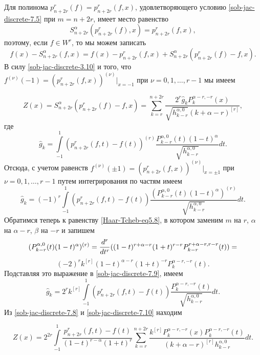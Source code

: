 Для полинома $p_{n+2r}^r(f)=p_{n+2r}^r(f,x)$, удовлетворяющего условию \eqref{sob-jac-discrete-7.5} при $m=n+2r$,  имеет место равенство
\begin{equation}\label{sob-jac-discrete-7.6}
 S_{n+2r}^\alpha(p_{n+2r}^r(f), x)=p_{n+2r}^r(f,x),
\end{equation}
поэтому, если $f\in W^r$, то мы можем записать
\begin{equation}\label{sob-jac-discrete-7.7}
 f(x)-S_{n+2r}^\alpha(f,x)=f(x)-
p_{n+2r}^r(f,x)+S_{n+2r}^\alpha(p_{n+2r}^r(f)-f,x).
\end{equation}
В силу  \eqref{sob-jac-discrete-3.10} и того, что $f^{(\nu)}(-1)=(p_{n+2r}^r(f,x))^{(\nu)}|_{x=-1}$ при $\nu=0,1,\ldots,r-1 $
мы имеем

\begin{equation}\label{sob-jac-discrete-7.8}
 Z(x)=S_{n+2r}^\alpha(p_{n+2r}^r(f)-f,x)=\sum_{k=r}^{n+2r} \frac{2^r\hat g_k P_{k}^{\alpha-r,-r}(x)}{\sqrt{h_{k-r}^{\alpha,0}}(k+\alpha-r)^{[r]}},
     \end{equation}
где
$$
\hat g_k= \int\limits_{-1}^1(p_{n+2r}^r(f,t)-f(t))^{(r)}\frac{P_{k-r}^{\alpha,0}(t)(1-t)^\alpha}{\sqrt{h_{k-r}^{\alpha,0}}} dt.
$$
Отсюда, с учетом равенств $f^{(\nu)}(\pm1)=(p_{n+2r}^r(f,x))^{(\nu)}|_{x=\pm1}$ при $\nu=0,1,\ldots,r-1 $  путем интегрирования по частям имеем
\begin{equation}\label{sob-jac-discrete-7.9}
\hat g_k= (-1)^r\int\limits_{-1}^1(p_{n+2r}^r(f,t)-f(t))\frac{(P_{k-r}^{\alpha,0}(t)(1-t)^\alpha)^{(r)}}{\sqrt{h_{k-r}^{\alpha,0}}} dt.
\end{equation}
Обратимся теперь к равенству \eqref{Haar-Tcheb-eq5.8}, в котором заменим $m$ на $r$, $\alpha$ на $\alpha-r$, $\beta$ на $-r$  и запишем
\begin{equation*}
(P_{k-r}^{\alpha,0}(t)(1-t)^\alpha)^{(r)} = {d^r\over dt^r}((1-t)^{r+\alpha-r}(1+t)^{r-r}P_{k-r}^{r+\alpha-r,r-r}(t))=
\end{equation*}
$$
(-2)^rk^{[r]}(1-t)^{\alpha-r}(1+t)^{-r}P_{k}^{\alpha-r,-r}(t).
$$
Подставляя это выражение в \eqref{sob-jac-discrete-7.9}, имеем
\begin{equation}\label{sob-jac-discrete-7.10}
\hat g_k= 2^rk^{[r]}\int\limits_{-1}^1(p_{n+2r}^r(f,t)-f(t))\frac{P_{k}^{\alpha-r,-r}(t)}{\sqrt{h_{k-r}^{\alpha,0}}} dt.
\end{equation}
Из \eqref{sob-jac-discrete-7.8} и \eqref{sob-jac-discrete-7.10} находим

\begin{equation}\label{sob-jac-discrete-7.11}
 Z(x)=2^{2r}\int\limits_{-1}^1\frac{p_{n+2r}^r(f,t)-f(t)}{(1-t)^{r-\alpha}(1+t)^{r}}\sum_{k=r}^{n+2r} \frac{k^{[r]} P_{k}^{\alpha-r,-r}(x)P_{k}^{\alpha-r,-r}(t)}{(k+\alpha-r)^{[r]}h_{k-r}^{\alpha,0}}dt.
 \end{equation}


